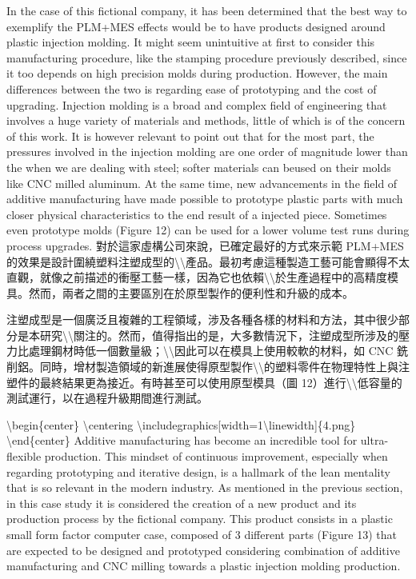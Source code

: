In the case of this fictional company, it has been determined that the
best way to exemplify the PLM+MES effects would be to have products
designed around plastic injection molding. It might seem unintuitive at
first to consider this manufacturing procedure, like the stamping
procedure previously described, since it too depends on high precision
molds during production. However, the main differences between the two
is regarding ease of prototyping and the cost of upgrading. Injection
molding is a broad and complex field of engineering that involves a huge
variety of materials and methods, little of which is of the concern of
this work. It is however relevant to point out that for the most part,
the pressures involved in the injection molding are one order of
magnitude lower than the when we are dealing with steel; softer
materials can beused on their molds like CNC milled aluminum. At the
same time, new advancements in the field of additive manufacturing have
made possible to prototype plastic parts with much closer physical
characteristics to the end result of a injected piece. Sometimes even
prototype molds (Figure 12) can be used for a lower volume test runs
during process upgrades. 對於這家虛構公司來說，已確定最好的方式來示範
PLM+MES
的效果是設計圍繞塑料注塑成型的\textbackslash\textbackslash 產品。最初考慮這種製造工藝可能會顯得不太直觀，就像之前描述的衝壓工藝一樣，因為它也依賴\textbackslash\textbackslash 於生產過程中的高精度模具。然而，兩者之間的主要區別在於原型製作的便利性和升級的成本。

注塑成型是一個廣泛且複雜的工程領域，涉及各種各樣的材料和方法，其中很少部分是本研究\textbackslash\textbackslash 關注的。然而，值得指出的是，大多數情況下，注塑成型所涉及的壓力比處理鋼材時低一個數量級；\textbackslash\textbackslash 因此可以在模具上使用較軟的材料，如
CNC
銑削鋁。同時，增材製造領域的新進展使得原型製作\textbackslash\textbackslash 的塑料零件在物理特性上與注塑件的最終結果更為接近。有時甚至可以使用原型模具（圖
12）進行\textbackslash\textbackslash 低容量的測試運行，以在過程升級期間進行測試。

\textbackslash begin\{center\} \textbackslash centering
\textbackslash includegraphics{[}width=1\textbackslash linewidth{]}\{4.png\}
\textbackslash end\{center\} Additive manufacturing has become an
incredible tool for ultra-flexible production. This mindset of
continuous improvement, especially when regarding prototyping and
iterative design, is a hallmark of the lean mentality that is so
relevant in the modern industry. As mentioned in the previous section,
in this case study it is considered the creation of a new product and
its production process by the fictional company. This product consists
in a plastic small form factor computer case, composed of 3 different
parts (Figure 13) that are expected to be designed and prototyped
considering combination of additive manufacturing and CNC milling
towards a plastic injection molding production.

